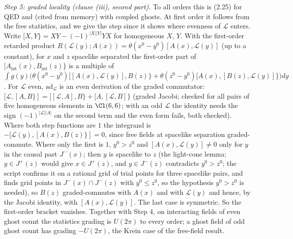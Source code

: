 \emph{Step 5: graded locality (clause (iii), second part).} To all orders this is \cite{DutschFredenhagen1999} (2.25) for QED and \cite{Hollands2008} (cited from memory) with coupled ghosts. At first order it follows from the free statistics, and we give the step since it shows where evenness of $\mathcal{L}$ enters. Write $[X, Y\} = XY - (-1)^{|X||Y|}YX$ for homogeneous $X$, $Y$. With the first-order retarded product $R(\mathcal{L}(y); A(x)) = \theta(x^{0} - y^{0})[A(x), \mathcal{L}(y)]$ (up to a constant), for $x$ and $z$ spacelike separated the first-order part of $[A_{\mathrm{int}}(x), B_{\mathrm{int}}(z)\}$ is a multiple of $\int g(y)\bigl(\theta(x^{0} - y^{0})[[A(x), \mathcal{L}(y)], B(z)\} + \theta(z^{0} - y^{0})[A(x), [B(z), \mathcal{L}(y)]\}\bigr)dy$. For $\mathcal{L}$ even, $\mathrm{ad}_{\mathcal{L}}$ is an even derivation of the graded commutator: $[\mathcal{L}, [A, B\}] = [[\mathcal{L}, A], B\} + [A, [\mathcal{L}, B]\}$ (graded Jacobi; checked for all pairs of five homogeneous elements in $\Cl(6, 6)$; with an odd $\mathcal{L}$ the identity needs the sign $(-1)^{|\mathcal{L}||A|}$ on the second term and the even form fails, both checked). Where both step functions are $1$ the integrand is $-[\mathcal{L}(y), [A(x), B(z)\}] = 0$, since free fields at spacelike separation graded-commute. Where only the first is $1$, $y^{0} > z^{0}$ and $[A(x), \mathcal{L}(y)] \neq 0$ only for $y$ in the causal past $J^{-}(x)$; then $y$ is spacelike to $z$ (the light-cone lemma: $y \in J^{+}(z)$ would give $x \in J^{+}(z)$, and $y \in J^{-}(z)$ contradicts $y^{0} > z^{0}$; the script confirms it on a rational grid of trial points for three spacelike pairs, and finds grid points in $J^{-}(x) \cap J^{-}(z)$ with $y^{0} \le z^{0}$, so the hypothesis $y^{0} > z^{0}$ is needed), so $B(z)$ graded-commutes with $A(x)$ and with $\mathcal{L}(y)$ and hence, by the Jacobi identity, with $[A(x), \mathcal{L}(y)]$. The last case is symmetric. So the first-order bracket vanishes. Together with Step 4, on interacting fields of even ghost count the statistics grading is $U(2\pi)$ to every order; a ghost field of odd ghost count has grading $-U(2\pi)$, the Krein case of the free-field result.

